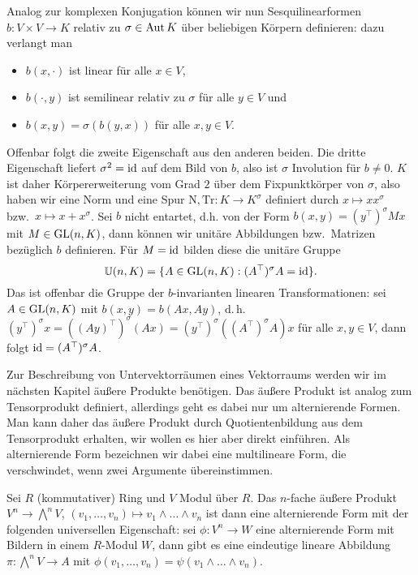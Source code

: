 Analog zur komplexen Konjugation können wir nun Sesquilinearformen $b: V \times V \to K$ relativ zu $\sigma \in \operatorname{Aut} K$ über beliebigen Körpern definieren: dazu verlangt man
\begin{itemize}
\item $b(x, \cdot)$ ist linear für alle $x \in V$,
\item $b(\cdot, y)$ ist semilinear relativ zu $\sigma$ für alle $y \in V$ und
\item $b(x,y) = \sigma(b(y,x))$ für alle $x,y \in V$.
\end{itemize}
Offenbar folgt die zweite Eigenschaft aus den anderen beiden. Die dritte Eigenschaft liefert $\sigma^2 = \operatorname{id}$ auf dem Bild von $b$, also ist $\sigma$ Involution für $b \neq 0$. $K$ ist daher Körpererweiterung vom Grad $2$ über dem Fixpunktkörper von $\sigma$, also haben wir eine Norm und eine Spur $\mathrm{N}, \mathrm{Tr}: K \to K^\sigma$ definiert durch $x \mapsto x x^\sigma$ bzw.~$x \mapsto x + x^\sigma$. Sei $b$ nicht entartet, d.h. von der Form $b(x,y) = (y^\top)^\sigma M x$ mit $M \in \mathrm{GL}(n,K)$, dann können wir unitäre Abbildungen bzw.~Matrizen bezüglich $b$ definieren. Für $M = \operatorname{id}$ bilden diese die unitäre Gruppe
\begin{equation}
\mathbb U(n,K) = \{ A \in \mathrm{GL}(n,K): (A^\top)^\sigma A = \operatorname{id} \}.
\end{equation}
Das ist offenbar die Gruppe der $b$-invarianten linearen Transformationen: sei $A \in \mathrm{GL}(n,K)$ mit $b(x,y) = b(Ax,Ay)$, d.\,h. $(y^\top)^\sigma x = ((Ay)^\top)^\sigma (Ax) = (y^\top)^\sigma ((A^\top)^\sigma A) x$ für alle $x, y \in V$, dann folgt $\operatorname{id} = (A^\top)^\sigma A$.

Zur Beschreibung von Untervektorräumen eines Vektorraums werden wir im nächsten Kapitel äußere Produkte benötigen. Das äußere Produkt ist analog zum Tensorprodukt definiert, allerdings geht es dabei nur um alternierende Formen. Man kann daher das äußere Produkt durch Quotientenbildung aus dem Tensorprodukt erhalten, wir wollen es hier aber direkt einführen. Als alternierende Form bezeichnen wir dabei eine multilineare Form, die verschwindet, wenn zwei Argumente übereinstimmen.

\begin{defin}
Sei $R$ (kommutativer) Ring und $V$ Modul über $R$. Das $n$-fache äußere Produkt $V^n \to \bigwedge^n V$, $(v_1, \dots, v_n) \mapsto v_1 \wedge \dots \wedge v_n$ ist dann eine alternierende Form mit der folgenden universellen Eigenschaft: sei $\phi: V^n \to W$ eine alternierende Form mit Bildern in einem $R$-Modul $W$, dann gibt es eine eindeutige lineare Abbildung $\pi: \bigwedge^n V \to A$ mit $\phi(v_1, \dots, v_n) = \psi(v_1 \wedge \dots \wedge v_n)$.
\end{defin}

